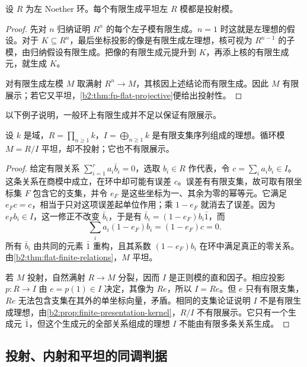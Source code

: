 \begin{corollary}\label{b2:cor:noetherian-fg-flat-projective}
	设 \(R\) 为左 Noether 环。每个有限生成平坦左 \(R\) 模都是投射模。
\end{corollary}
\begin{proof}
	先对 \(n\) 归纳证明 \(R^n\) 的每个左子模有限生成。\(n=1\) 时这就是左理想的假设。对于 \(K\subseteq R^n\)，最后坐标投影的像是有限生成左理想，核可视为 \(R^{n-1}\) 的子模，由归纳假设有限生成。把像的有限生成元提升到 \(K\)，再添上核的有限生成元，就生成 \(K\)。

	对有限生成左模 \(M\) 取满射 \(R^n\to M\)，其核因上述结论而有限生成。因此 \(M\) 有限展示；若它又平坦，\cref{b2:thm:fp-flat-projective}便给出投射性。
\end{proof}

以下例子说明，一般环上有限生成并不足以保证有限展示。

\begin{example}[有限生成平坦但非投射的循环模]\label{b2:exm:fg-flat-nonprojective}
	设 \(k\) 是域，\(R=\prod_{n\ge1}k\)，\(I=\bigoplus_{n\ge1}k\) 是有限支集序列组成的理想。循环模 \(M=R/I\) 平坦，却不投射；它也不有限展示。
\end{example}
\begin{proof}
	给定有限关系 \(\sum_{i=1}^r a_i\bar b_i=0\)，选取 \(b_i\in R\) 作代表，令 \(c=\sum_i a_i b_i\in I\)。这条关系在商模中成立，在环中却可能有误差 \(c\)。误差有有限支集，故可取有限坐标集 \(F\) 包含它的支集，并令 \(e_F\) 是这些坐标为一、其余为零的幂等元。它满足 \(e_Fc=c\)，相当于只对这项误差起单位作用；乘 \(1-e_F\) 就消去了误差。因为 \(e_Fb_i\in I\)，这一修正不改变 \(\bar b_i\)，于是有 \(\bar b_i=(1-e_F)b_i\bar1\)，而
	\[
		\sum_i a_i(1-e_F)b_i=(1-e_F)c=0.
	\]
	所有 \(\bar b_i\) 由共同的元素 \(\bar1\) 重构，且其系数 \((1-e_F)b_i\) 在环中满足真正的零关系。由\cref{b2:thm:flat-finite-relations}，\(M\) 平坦。

	若 \(M\) 投射，自然满射 \(R\to M\) 分裂，因而 \(I\) 是正则模的直和因子。相应投影 \(p:R\to I\) 由 \(e=p(1)\in I\) 决定，其像为 \(Re\)，所以 \(I=Re\)。但 \(e\) 只有有限支集，\(Re\) 无法包含支集在其外的单坐标向量，矛盾。相同的支集论证说明 \(I\) 不是有限生成理想，由\cref{b2:prop:finite-presentation-kernel}，\(R/I\) 不有限展示。它只有一个生成元 \(\bar1\)，但这个生成元的全部关系组成的理想 \(I\) 不能由有限多条关系生成。
\end{proof}

\subsection{投射、内射和平坦的同调判据}
\label{b2:subsec:0704:03}

